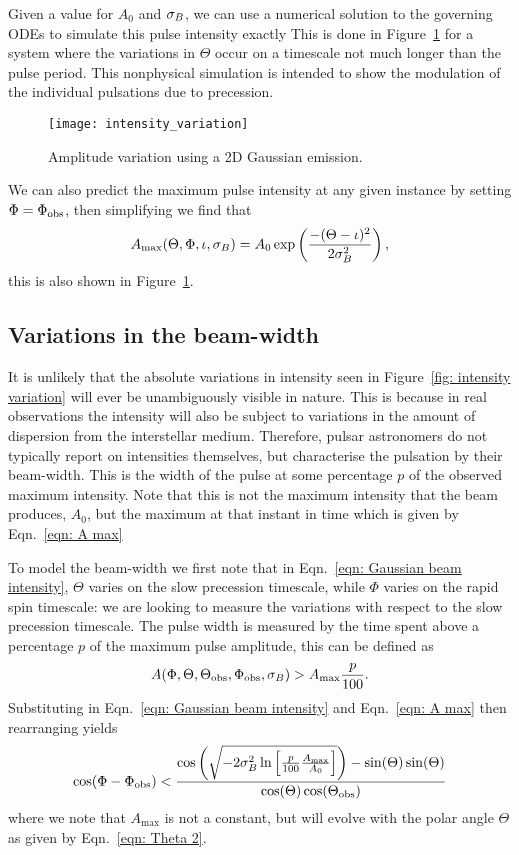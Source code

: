 \documentclass[../full_thesis/full_thesis.tex]{subfiles}
\begin{document}
Given a value for $A_0$ and $\sigma_{B}$, we can use a numerical solution to the
governing ODEs to simulate this pulse intensity exactly This is done in
Figure~\ref{fig: intensity variation} for a system where the variations in
$\Theta$ occur on a timescale not much longer than the pulse period. This
nonphysical simulation is intended to show the modulation of the individual
pulsations due to precession.
\begin{figure}[htb]
\centering
\texttt{[image: intensity\_variation]}
\caption{Amplitude variation using a 2D Gaussian emission.}
\label{fig: intensity variation}
\end{figure}
We can also predict the maximum pulse intensity at any given instance by setting
$\Phi=\Phi_{\mathrm{obs}}$, then simplifying we find that
\begin{align}
A_{\mathrm{max}}(\Theta, \Phi, \iota, \sigma_{B}) =
A_{0}\exp\left(\frac{-(\Theta-\iota)^{2}}{2\sigma_{B}^{2}}\right),
\label{eqn: A max}
\end{align}
this is also shown in Figure~\ref{fig: intensity variation}.

\subsection{Variations in the beam-width}
\label{sec: numerical beam-width}
It is unlikely that the absolute variations in intensity seen in Figure~\ref{fig:
intensity variation} will ever be unambiguously visible in nature. This is
because in real observations the intensity will also be
subject to variations in the
amount of dispersion from the interstellar medium. Therefore, pulsar astronomers
do not typically report on intensities themselves, but characterise the pulsation
by their beam-width. This is the width of the pulse at some percentage $p$ of
the observed maximum intensity. Note that this is not the maximum intensity that
the beam produces, $A_0$, but the maximum at that instant in time which is
given by Eqn.~\eqref{eqn: A max}

To model the beam-width we first note that in Eqn.~\eqref{eqn: Gaussian beam intensity},
$\Theta$ varies on the slow precession timescale, while $\Phi$ varies on the
rapid spin timescale: we are looking to measure the variations with respect to
the slow precession timescale.  The pulse width is measured by the time spent
above a percentage $p$ of the maximum pulse amplitude, this can be defined as
\begin{align}
A(\Phi, \Theta, \Theta_{\mathrm{obs}}, \Phi_{\mathrm{obs}}, \sigma_{B}) > A_{\textrm{max}} \frac{p}{100}.
\end{align}
Substituting in Eqn.~\eqref{eqn: Gaussian beam intensity} and Eqn.~\eqref{eqn: A max}
then rearranging yields
\begin{equation}
\cos(\Phi - \Phi_{\mathrm{obs}}) < \frac{
\cos\left(
\sqrt{-2\sigma_{B}^{2} \ln\left[\frac{p}{100}\frac{A_\textrm{max}}{A_0}\right]}\right) - \sin(\Theta)\sin(\Theta)}
                          {\cos(\Theta)\cos(\Theta_{\mathrm{obs}})}
\label{eqn: 6737}
\end{equation}
where we note that $A_\textrm{max}$ is not a constant, but will evolve with the
polar angle $\Theta$ as given by Eqn.~\eqref{eqn: Theta 2}.
\end{document}
